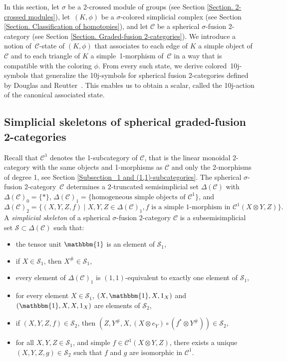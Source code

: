 \documentclass[a4paper, oneside]{amsart}
\makeatletter
\let\origsection\section
\renewcommand\section{\@ifstar{\starsection}{\nostarsection}}
\newcommand\nostarsection[1]
{\sectionprelude\origsection{#1}\sectionpostlude}
\newcommand\starsection[1]
{\sectionprelude\origsection*{#1}\sectionpostlude}
\newcommand\sectionprelude{%
  \vspace{1em}
}
\newcommand\sectionpostlude{%
  \vspace{1em}
}
\numberwithin{equation}{subsection}
\theoremstyle{referencedlemma}
\theoremstyle{plain} %
\theoremstyle{remark}
\makeatother
\begin{document}
\section{Colored 10j-symbols}\label{Section. 10j-symbols}

\noindent In this section,  let $\sigma$ be a 2-crossed module of groups (see Section \ref{Section. 2-crossed modules}),  let~$(K,\phi)$ be a $\sigma$-colored simplicial complex (see Section \ref{Section. Classification of homotopies}), and let $\mathcal{C}$ be a spherical $\sigma$-fusion 2-category (see Section \ref{Section. Graded-fusion 2-categories}). We introduce a notion of~$\mathcal{C}$-state of $(K,\phi)$ that associates to each edge of $K$ a simple object of $\mathcal{C}$ and to each triangle of $K$ a simple~1-morphism of~$\mathcal{C}$ in a way that is compatible with the coloring $\phi$.  From every such state, we derive colored~10j-symbols that generalize the 10j-symbols for spherical fusion 2-categories defined by Douglas and Reutter~\cite{douglas_fusion_2018}.  This enables us to obtain a scalar,  called the 10j-action of the canonical associated state. 

\subsection{Simplicial skeletons of spherical graded-fusion 2-categories}
Recall that $\mathcal{C}^1$ denotes the 1-subcategory of $\mathcal{C}$, that is the linear monoidal 2-category with the same objects and 1-morphisms as $\mathcal{C}$ and only the 2-morphisms of degree 1, see Section \ref{Subsection_1 and (1,1)-subcategories}.  The spherical $\sigma$-fusion 2-cate\-gory~$\mathcal{C}$ determines a 2-truncated semisimplicial set $\Delta(\mathcal{C})$ with $\Delta(\mathcal{C})_0 = \{*\}$,  $\Delta(\mathcal{C})_1 = \{\text{homogeneous simple objects of }\mathcal{C}^1\}$, and 
$$
\Delta(\mathcal{C})_2 = \{(X,Y,Z, f) \mid X, Y, Z \in \Delta(\mathcal{C})_1,  f \text{ is a simple 1-morphism in }\mathcal{C}^1(X\otimes Y, Z)\}.
$$
A \emph{simplicial skeleton} of a spherical $\sigma$-fusion 2-category $\mathcal{C}$ is a subsemisimplicial set $\mathcal{S} \subset \Delta(\mathcal{C})$ such that:
\begin{itemize}
\item the tensor unit $\mathbbm{1}$ is an element of $\mathcal{S}_1$,
\item if $X\in \mathcal{S}_1$, then $X^\#\in \mathcal{S}_1$,
\item every element of $\Delta(\mathcal{C})_1$ is $(1,1)$-equivalent to exactly one element of $\mathcal{S}_1$, 
\item for every element $X \in \mathcal{S}_1$, $(X,\mathbbm{1}, X, 1_X)$ and $(\mathbbm{1}, X, X, 1_X)$  are elements of $\mathcal{S}_2$,
\item if $(X,Y,Z, f) \in \mathcal{S}_2$, then $(Z, Y^\#, X, (X\otimes e_Y) \circ (f^*\otimes Y^\#)) \in \mathcal{S}_2$,
\item for all $X, Y, Z\in \mathcal{S}_1$, and simple $f\in \mathcal{C}^1(X\otimes Y, Z)$, there exists a unique $(X,Y,Z,g)\in \mathcal{S}_2$ such that $f$ and $g$ are isomorphic in $\mathcal{C}^1$.
\end{itemize}
\end{document}
